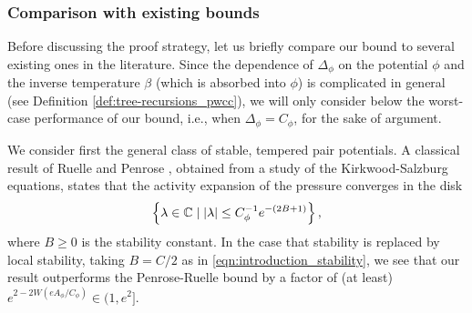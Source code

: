 \documentclass[11pt]{article}
\newcommand{\C}{\mathbb C}
\newcommand{\pwcc}{\Delta_{\phi}}
\newcommand{\aconst}{A_{\phi}}
\newcommand{\sconst}{B}
\newcommand{\lsconst}{C}
\newcommand{\set}[1]{\left\{#1\right\}}
\numberwithin{equation}{section}
\theoremstyle{plain}
\theoremstyle{definition}
\theoremstyle{remark}
\begin{document}
\subsubsection{Comparison with existing bounds}
\label{sec:introduction_model_comparison}

Before discussing the proof strategy, let us briefly compare our bound to several existing ones in the literature.
Since the dependence of $\pwcc$ on the potential $\phi$ and the inverse temperature $\beta$ (which is absorbed into $\phi$) is complicated in general (see Definition \ref{def:tree-recursions_pwcc}), we will only consider below the worst-case performance of our bound, i.e., when $\pwcc=C_{\phi}$, for the sake of argument.

We consider first the general class of stable, tempered pair potentials.
A classical result of Ruelle \cite{ruelle1963correlation} and Penrose \cite{penrose1963convergence}, obtained from a study of the Kirkwood-Salzburg equations, states that the activity expansion of the pressure converges in the disk 
\begin{equation}
\label{eqn:introduction_Penrose-Ruelle}
\set{\lambda\in\C\mid\abs{\lambda}\le C_{\phi}^{-1}e^{-(2\sconst+1)}},
\end{equation} 
where $\sconst\ge 0$ is the stability constant.
In the case that stability is replaced by local stability, taking $\sconst=\lsconst/2$ as in \eqref{eqn:introduction_stability}, we see that our result outperforms the Penrose-Ruelle bound by a factor of (at least) $e^{2-2W(e\aconst/C_{\phi})}\in(1,e^{2}]$.
\end{document}
